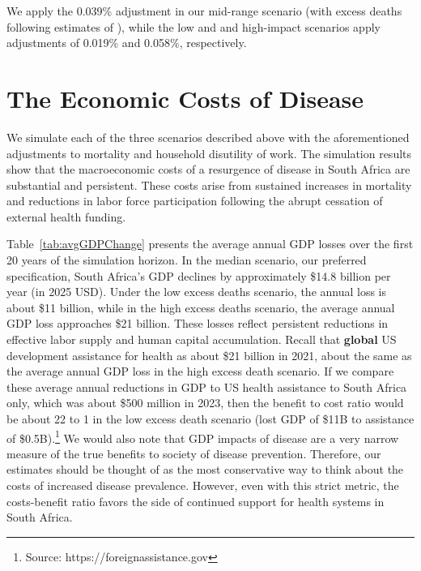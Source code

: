 \documentclass[letterpaper,12pt]{article}
\theoremstyle{definition}
\begin{document}
\begin{spacing}{1.5}
We apply the 0.039\% adjustment in our mid-range scenario (with excess deaths following estimates of \citet{Gandhi2025}), while the low and and high-impact scenarios apply adjustments of 0.019\% and 0.058\%, respectively.




\section{The Economic Costs of Disease}\label{SecResults}

We simulate each of the three scenarios described above with the aforementioned adjustments to mortality and household disutility of work.  The simulation results show that the macroeconomic costs of a resurgence of disease in South Africa are substantial and persistent. These costs arise from sustained increases in mortality and reductions in labor force participation following the abrupt cessation of external health funding.

Table~\ref{tab:avgGDPChange} presents the average annual GDP losses over the first 20 years of the simulation horizon. In the median scenario, our preferred specification, South Africa's GDP declines by approximately \$14.8 billion per year (in 2025 USD). Under the low excess deaths scenario, the annual loss is about \$11 billion, while in the high excess deaths scenario, the average annual GDP loss approaches \$21 billion. These losses reflect persistent reductions in effective labor supply and human capital accumulation.  Recall that \textbf{global} US development assistance for health as about \$21 billion in 2021, about the same as the average annual GDP loss in the high excess death scenario.  If we compare these average annual reductions in GDP to US health assistance to South Africa only, which was about \$500 million in 2023, then the benefit to cost ratio would be about 22 to 1 in the low excess death scenario (lost GDP of \$11B to assistance of \$0.5B).\footnote{Source: https://foreignassistance.gov} We would also note that GDP impacts of disease are a very narrow measure of the true benefits to society of disease prevention.  Therefore, our estimates should be thought of as the most conservative way to think about the costs of increased disease prevalence. However, even with this strict metric, the costs-benefit ratio favors the side of continued support for health systems in South Africa.


\end{spacing}
\end{document}
